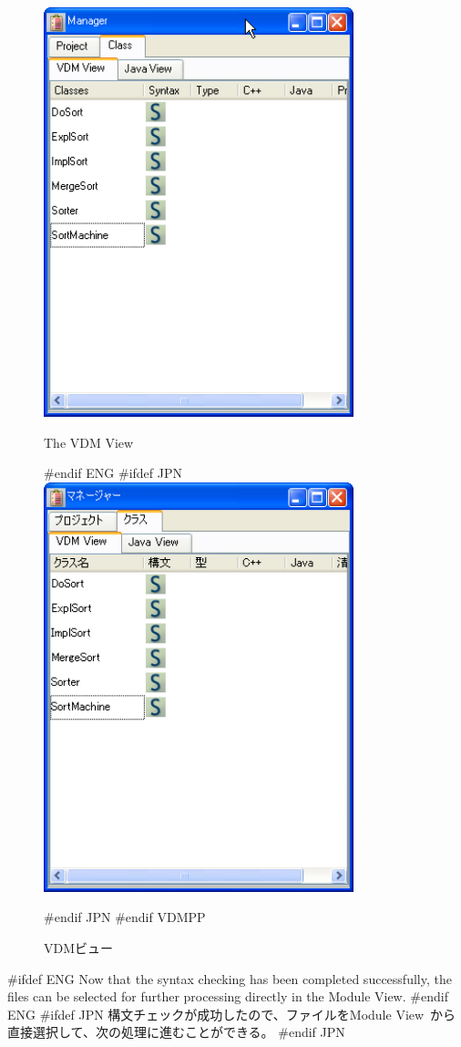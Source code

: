 \documentclass[\pformat,12pt]{article}
\newcommand{\vdmModView}{\guicmd{Module View}}
\newcommand{\vdmModView}{\guicmd{モジュールビュー}}
\newcommand{\vdmModView}{\guicmd{VDM View}}
\newcommand{\vdmModView}{\guicmd{VDMビュー}}
\newcommand{\guicmd}[1]{{\sf #1}}
\newcommand{\guicmd}[1]{{\gt #1}}
\begin{document}
\begin{figure}[tbh]
\begin{center}
\includegraphics[width=9cm]{vdmViewENG.png}
\caption{The VDM View}
#endif ENG
#ifdef JPN
\includegraphics[width=9cm]{vdmView.png}
\caption{VDMビュー}
#endif JPN
#endif VDMPP
\label{fig:vdmModView}
\end{center}
\end{figure}

#ifdef ENG
Now that the syntax checking has been completed successfully, the
files can be selected for further processing directly in the \vdmModView.
#endif ENG
#ifdef JPN
構文チェックが成功したので、ファイルを\vdmModView\ から直接選択して、次の処理に進むことができる。
#endif JPN
\end{document}
